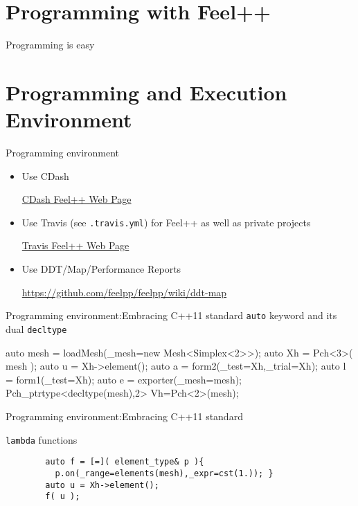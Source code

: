 \section{Programming with Feel++}






\begin{frame}{Programming is easy}

\end{frame}


\section{Programming and Execution Environment}


\begin{frame}{Programming environment}
  \begin{itemize}
  \item Use CDash
    \centerline{\href{http://my.cdash.org/index.php?project=Feel\%2B\%2B&display=project}{CDash
        Feel++ Web Page}}
  \item  Use Travis (see \texttt{.travis.yml}) for Feel++ as well as
    private projects
    \centerline{\href{https://travis-ci.org/feelpp/feelpp}{Travis
        Feel++ Web Page}}
  \item Use DDT/Map/Performance Reports
    \centerline{\url{https://github.com/feelpp/feelpp/wiki/ddt-map}}
  \end{itemize}
\end{frame}

\begin{frame}[fragile]{Programming environment:Embracing C++11 standard }
    \texttt{auto} keyword and its dual
    \texttt{decltype}
    \begin{cppcode}
      auto mesh = loadMesh(_mesh=new Mesh<Simplex<2>>);
      auto Xh = Pch<3>( mesh );
      auto u = Xh->element();
      auto a = form2(_test=Xh,_trial=Xh);
      auto l = form1(_test=Xh);
      auto e = exporter(_mesh=mesh);
      Pch_ptrtype<decltype(mesh),2> Vh=Pch<2>(mesh);
    \end{cppcode}
\end{frame}

\begin{frame}[fragile]{Programming environment:Embracing C++11 standard }

    \texttt{lambda} functions

      \begin{verbatim}
        auto f = [=]( element_type& p ){
          p.on(_range=elements(mesh),_expr=cst(1.)); }
        auto u = Xh->element();
        f( u );
      \end{verbatim}
\end{frame}

